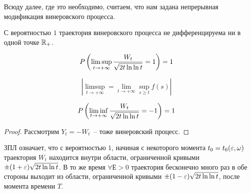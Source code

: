 \begin{remark}
Всюду далее, где это необходимо, считаем, что нам задана непрерывная модификация винеровского
процесса.
\end{remark}

\begin{theorem}
С вероятностью $1$ траектория винеровского процесса не дифференцируема ни в одной точке $\mathbb{R}_+$.
\end{theorem}
\begin{theorem}
$$P \left(  \limsup_{t \to +\infty} \frac{W_t}{\sqrt{2t \ln \ln t}} = 1  \right) = 1$$

$$ \left| \limsup_{t \to +\infty} = \lim_{t\to +\infty} \sup_{s \geq t} f(s) \right| $$
\end{theorem}
\begin{corollary}
$$P \left(  \liminf_{t \to +\infty} \frac{W_t}{\sqrt{2t \ln \ln t}} = -1  \right) = 1$$
\end{corollary}
\begin{proof}
Рассмотрим $Y_t = -W_t$~-- тоже винеровский процесс.
\end{proof}

ЗПЛ означает, что с вероятностью $1$, начиная с некоторого момента $t_0 = t_0(\varepsilon, \omega)$
траектория $W_t$ находится внутри области, ограниченной кривыми $\pm (1+\varepsilon)\sqrt{2t\ln\ln t}$.
В то же время $\forall Е > 0$ траектория бесконечно много раз в обе стороны выходит из области,
ограниченной кривыми $\pm (1-\varepsilon)\sqrt{2t\ln\ln t}$, после момента времени $T$.

